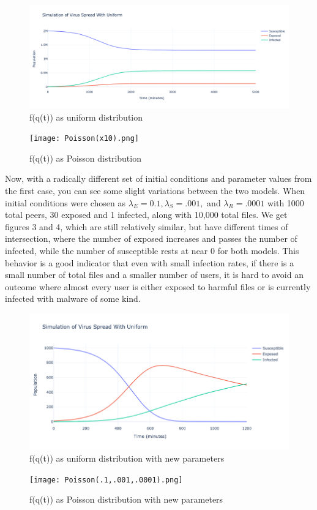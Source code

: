 \documentclass[12pt, oneside]{article}
\begin{document}
    \begin{figure}[htbp]
        \centerline{\includegraphics[scale=0.5]{Uniform(x10).png}}
        \caption{f(q(t)) as uniform distribution}
    \end{figure}
    \begin{figure}[htbp]
        \centerline{\texttt{[image: Poisson(x10).png]}}
        \caption{f(q(t)) as Poisson distribution}
    \end{figure}

    Now, with a radically different set of initial conditions and parameter values from the first case, you can see some slight variations between the two models. When initial conditions were chosen as
    $\lambda_E = 0.1, \lambda_S = .001,$ and $\lambda_R = .0001$ with 1000 total peers, 30 exposed and 1 infected, along with 10,000 total files. We get figures 3 and 4, which are still relatively similar,
    but have different times of intersection, where the number of exposed increases and passes the number of infected, while the number of susceptible rests at near 0 for both models.
    This behavior is a good indicator that even with small infection rates, if there is a small number of total files and a smaller number of users, it is hard to avoid
    an outcome where almost every user is either exposed to harmful files or is currently infected with malware of some kind.

    \begin{figure}[htbp]
        \centerline{\includegraphics[scale=0.5]{Uniform(.1,.001,.0001).png}}
        \caption{f(q(t)) as uniform distribution with new parameters}
    \end{figure}
    \begin{figure}[htbp]
        \centerline{\texttt{[image: Poisson(.1,.001,.0001).png]}}
        \caption{f(q(t)) as Poisson distribution with new parameters}
    \end{figure}






\end{document}
